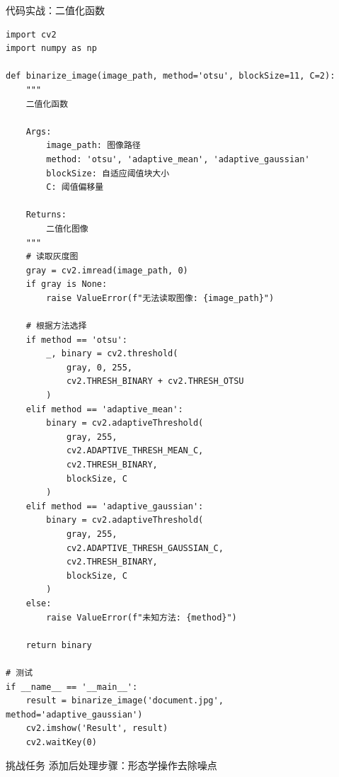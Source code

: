 \begin{frame}[fragile]{代码实战：二值化函数}
    \begin{lstlisting}[basicstyle=\ttfamily\scriptsize]
import cv2
import numpy as np

def binarize_image(image_path, method='otsu', blockSize=11, C=2):
    """
    二值化函数

    Args:
        image_path: 图像路径
        method: 'otsu', 'adaptive_mean', 'adaptive_gaussian'
        blockSize: 自适应阈值块大小
        C: 阈值偏移量

    Returns:
        二值化图像
    """
    # 读取灰度图
    gray = cv2.imread(image_path, 0)
    if gray is None:
        raise ValueError(f"无法读取图像: {image_path}")

    # 根据方法选择
    if method == 'otsu':
        _, binary = cv2.threshold(
            gray, 0, 255,
            cv2.THRESH_BINARY + cv2.THRESH_OTSU
        )
    elif method == 'adaptive_mean':
        binary = cv2.adaptiveThreshold(
            gray, 255,
            cv2.ADAPTIVE_THRESH_MEAN_C,
            cv2.THRESH_BINARY,
            blockSize, C
        )
    elif method == 'adaptive_gaussian':
        binary = cv2.adaptiveThreshold(
            gray, 255,
            cv2.ADAPTIVE_THRESH_GAUSSIAN_C,
            cv2.THRESH_BINARY,
            blockSize, C
        )
    else:
        raise ValueError(f"未知方法: {method}")

    return binary

# 测试
if __name__ == '__main__':
    result = binarize_image('document.jpg', method='adaptive_gaussian')
    cv2.imshow('Result', result)
    cv2.waitKey(0)
    \end{lstlisting}

    \begin{alertblock}{挑战任务}
        添加后处理步骤：形态学操作去除噪点
    \end{alertblock}
\end{frame}

